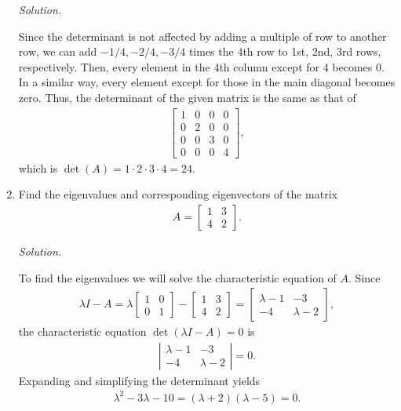 \documentclass{article}
\begin{document}
\begin{enumerate}
\emph{Solution.}

Since the determinant is not affected by adding a multiple of row to another row, we can add $-1/4,-2/4,-3/4$ times the 4th row to 1st, 2nd, 3rd rows, respectively.
Then, every element in the 4th column except for 4 becomes 0.
In a similar way, every element except for those in the main diagonal becomes zero. 
Thus, the determinant of the given matrix is the same as that of
	\begin{align*}
	\left[ \begin{array}{llll} 1&0&0&0 \\ 0&2&0&0 \\ 0&0&3&0 \\ 0&0&0&4 \end{array}\right],
	\end{align*}
which is $\det(A)=1\cdot 2\cdot3\cdot4=24$.

\item Find the eigenvalues and corresponding eigenvectors of the matrix
	\begin{align*}
	A=\left[ \begin{array}{ll} 1&3\\ 4&2 \end{array}\right].	
	\end{align*}

\emph{Solution.}

To find the eigenvalues we will solve the characteristic equation of $A$.
Since
	\begin{align*}
	\lambda I-A=\lambda \left[\begin{array}{ll} 1&0 \\ 0&1\end{array}\right]-\left[\begin{array}{ll} 1&3 \\ 4&2\end{array}\right]	=\left[\begin{array}{ll} \lambda-1&-3 \\ -4&\lambda-2\end{array}\right],
	\end{align*}
the characteristic equation $\det(\lambda I-A)=0$ is
	\begin{align*}
	\left|\begin{array}{ll} \lambda-1&-3 \\-4&\lambda-2 \end{array}\right|=0.	
	\end{align*}
Expanding and simplifying the determinant yields
	\begin{align*}
	\lambda^2-3\lambda-10=(\lambda+2)(\lambda-5)=0.	
	\end{align*}


\end{enumerate}
\end{document}
